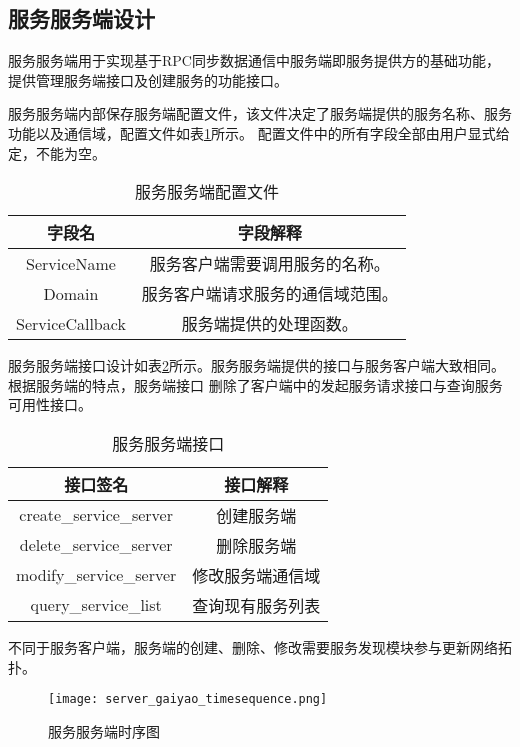 \subsection{服务服务端设计}
服务服务端用于实现基于RPC同步数据通信中服务端即服务提供方的基础功能，提供管理服务端接口及创建服务的功能接口。

服务服务端内部保存服务端配置文件，该文件决定了服务端提供的服务名称、服务功能以及通信域，配置文件如表\ref{service_server_config_file}所示。
配置文件中的所有字段全部由用户显式给定，不能为空。
\begin{table}[H]
  \centering\small
  \caption{服务服务端配置文件}
  \renewcommand\arraystretch{1.05}
  \label{service_server_config_file}
  \begin{tabular}{cc}
    \toprule
    字段名 & 字段解释 \\
    \midrule
    ServiceName & 服务客户端需要调用服务的名称。\\
    Domain & 服务客户端请求服务的通信域范围。\\
    ServiceCallback & 服务端提供的处理函数。\\
    \bottomrule
  \end{tabular}
\end{table}

服务服务端接口设计如表\ref{service_server_interface}所示。服务服务端提供的接口与服务客户端大致相同。根据服务端的特点，服务端接口
删除了客户端中的发起服务请求接口与查询服务可用性接口。
\begin{table}[htb]
  \centering\small
  \caption{服务服务端接口}
  \renewcommand\arraystretch{1.2}
  \label{service_server_interface}
  \begin{tabular}{cc}
    \toprule
    接口签名 & 接口解释 \\
    \midrule
    create\_service\_server & 创建服务端 \\
    delete\_service\_server & 删除服务端\\
    modify\_service\_server & 修改服务端通信域\\
    query\_service\_list & 查询现有服务列表\\
    \bottomrule
  \end{tabular}
\end{table}

不同于服务客户端，服务端的创建、删除、修改需要服务发现模块参与更新网络拓扑。

\begin{figure}[H]
  \centering
  \texttt{[image: server\_gaiyao\_timesequence.png]}
  \caption{服务服务端时序图}
  \label{server_gaiyao_timesequence}
\end{figure}

